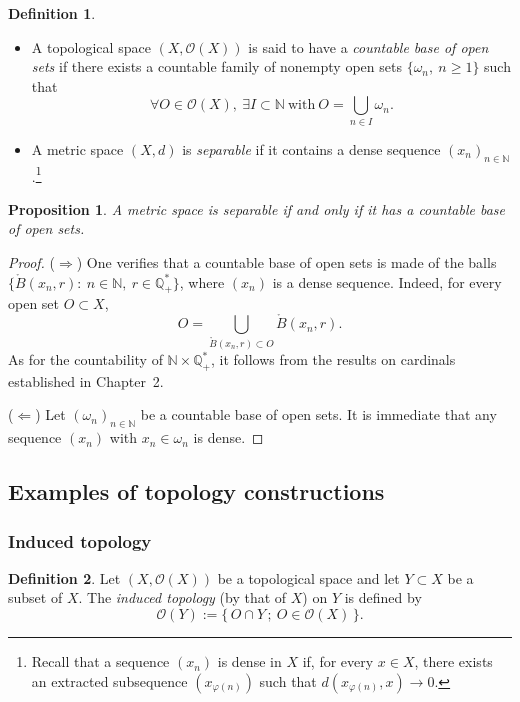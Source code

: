 \documentclass[11pt]{article}
\newtheorem{proposition}{Proposition}[section]
\theoremstyle{definition}
\newtheorem{definition}{Definition}[section]
\begin{document}
\begin{definition}
\begin{itemize}[leftmargin=1.5em]
\item[(a)] A topological space $(X,\mathcal{O}(X))$ is said to have a \emph{countable base of open sets} if there exists a countable family of nonempty open sets $\{\omega_n,\ n\ge 1\}$ such that
\[
\forall O\in\mathcal{O}(X),\ \exists I\subset\mathbb{N}\ \text{with}\ O=\bigcup_{n\in I}\omega_n .
\]
\item[(b)] A metric space $(X,d)$ is \emph{separable} if it contains a dense sequence $(x_n)_{n\in\mathbb{N}}$.\footnote{Recall that a sequence $(x_n)$ is dense in $X$ if, for every $x\in X$, there exists an extracted subsequence $(x_{\varphi(n)})$ such that $d(x_{\varphi(n)},x)\to 0$.}
\end{itemize}
\end{definition}

\begin{proposition}
A metric space is separable if and only if it has a countable base of open sets.
\end{proposition}

\begin{proof}
($\Rightarrow$) One verifies that a countable base of open sets is made of the balls
$\{\mathring{B}(x_n,r):\ n\in\mathbb{N},\ r\in\mathbb{Q}_+^{\!*}\}$, where $(x_n)$ is a dense sequence.
Indeed, for every open set $O\subset X$,
\[
O=\bigcup_{\mathring{B}(x_n,r)\subset O}\mathring{B}(x_n,r).
\]
As for the countability of $\mathbb{N}\times\mathbb{Q}_+^{\!*}$, it follows from the results on cardinals established in Chapter~2.

($\Leftarrow$) Let $(\omega_n)_{n\in\mathbb{N}}$ be a countable base of open sets.
It is immediate that any sequence $(x_n)$ with $x_n\in\omega_n$ is dense.\end{proof}

\subsection{Examples of topology constructions}

\subsubsection{Induced topology}

\begin{definition}
Let $(X,\mathcal{O}(X))$ be a topological space and let $Y\subset X$ be a subset of $X$.
The \emph{induced topology} (by that of $X$) on $Y$ is defined by
\[
\mathcal{O}(Y):=\{\,O\cap Y\,;\ O\in\mathcal{O}(X)\,\}.
\]
\end{definition}
\end{document}
